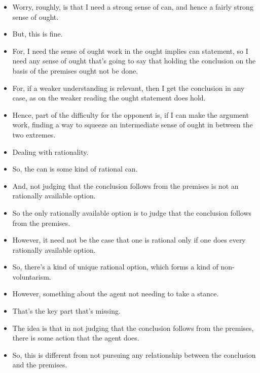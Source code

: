 \documentclass[10pt]{article}
\begin{document}
\begin{itemize}
\item Worry, roughly, is that I need a strong sense of can, and hence a fairly strong sense of ought.
\item But, this is fine.
\item For, I need the sense of ought work in the ought implies can statement, so I need any sense of ought that's going to say that holding the conclusion on the basis of the premises ought not be done.
\item For, if a weaker understanding is relevant, then I get the conclusion in any case, as on the weaker reading the ought statement does hold.
\item Hence, part of the difficulty for the opponent is, if I can make the argument work, finding a way to squeeze an intermediate sense of ought in between the two extremes.
\end{itemize}


\newpage

\begin{itemize}
\item Dealing with rationality.
\item So, the can is some kind of rational can.
\item And, not judging that the conclusion follows from the premises is not an rationally available option.
\item So the only rationally available option is to judge that the conclusion follows from the premises.
\item However, it need not be the case that one is rational only if one does every rationally available option.
\item So, there's a kind of unique rational option, which forms a kind of non-voluntarism.
\item However, something about the agent not needing to take a stance.
\item That's the key part that's missing.
\item The idea is that in not judging that the conclusion follows from the premises, there is some action that the agent does.
\item So, this is different from not pursuing any relationship between the conclusion and the premises.
\end{itemize}
\end{document}
